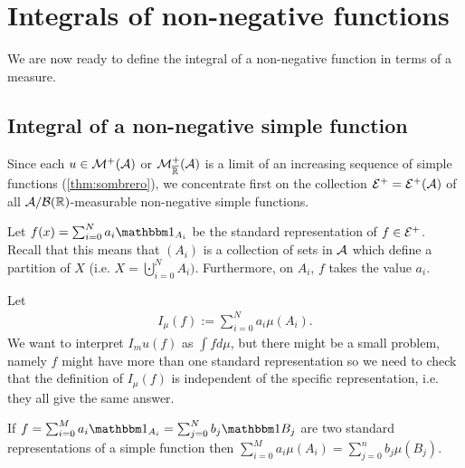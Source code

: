 
\chapter{Integrals of non-negative functions}

\label{chp:non-negative-integrals}

We are now ready to define the integral of a non-negative function in terms of a measure.

\section{Integral of a non-negative simple function}

Since each $u \in \mathcal{M}^+(\mathcal{A})$ or $\mathcal{M}^+_{\overline{\mathbb{R}}}(\mathcal{A})$ is a limit of an increasing sequence of simple functions (\autoref{thm:sombrero}), we concentrate first on the collection $\mathcal{E}^+ = \mathcal{E}^+(\mathcal{A})$ of all $\mathcal{A}/\mathcal{B}(\mathbb{R})$-measurable non-negative simple functions.

Let $f(x) = \sum_{i = 0}^N a_i \ind_{A_i}$ be the standard representation of $f \in \mathcal{E}^+$. Recall that this means that $(A_i)$ is a collection of sets in $\mathcal{A}$ which define a partition of $X$ (i.e. $X = \bigcupdot_{i = 0}^N A_i)$. Furthermore, on $A_i$, $f$ takes the value $a_i$.

Let
\begin{align}
	I_\mu(f) := \sum_{i = 0}^N a_i \mu(A_i).
\end{align}
We want to interpret $I_mu(f)$ as $\int f d\mu$, but there might be a small problem, namely $f$ might have more than one standard representation so we need to check that the definition of $I_\mu(f)$ is independent of the specific representation, i.e. they all give the same answer.

\begin{lem}
	If $f = \sum_{i = 0}^M a_i \ind_{A_i} = \sum_{j = 0}^N b_j \ind{B_j}$ are two standard representations of a simple function then $\sum_{i = 0}^M a_i\mu(A_i) = \sum_{j = 0}^n b_j \mu(B_j)$.
\end{lem}

